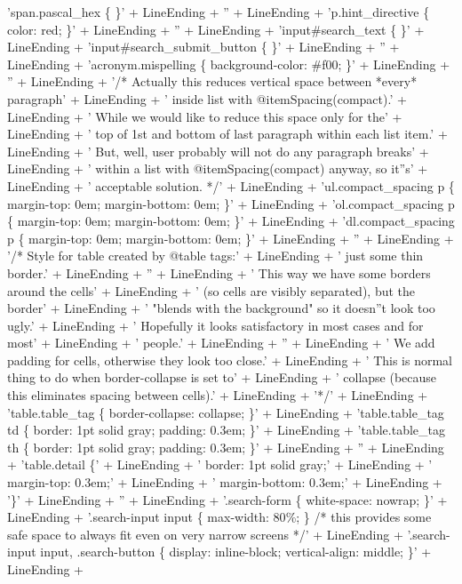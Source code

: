 \documentclass{report}
\begin{document}
\begin{list}{}
\begin{flushleft}
\begin{ttfamily}
'span.pascal{\_}hex {\{} {\}}' + LineEnding +
'' + LineEnding +
'p.hint{\_}directive {\{} color: red; {\}}' + LineEnding +
'' + LineEnding +
'input{\#}search{\_}text {\{} {\}}' + LineEnding +
'input{\#}search{\_}submit{\_}button {\{} {\}}' + LineEnding +
'' + LineEnding +
'acronym.mispelling {\{} background-color: {\#}f00; {\}}' + LineEnding +
'' + LineEnding +
'/* Actually this reduces vertical space between *every* paragraph' + LineEnding +
'   inside list with @itemSpacing(compact).' + LineEnding +
'   While we would like to reduce this space only for the' + LineEnding +
'   top of 1st and bottom of last paragraph within each list item.' + LineEnding +
'   But, well, user probably will not do any paragraph breaks' + LineEnding +
'   within a list with @itemSpacing(compact) anyway, so it''s' + LineEnding +
'   acceptable solution. */' + LineEnding +
'ul.compact{\_}spacing p {\{} margin-top: 0em; margin-bottom: 0em; {\}}' + LineEnding +
'ol.compact{\_}spacing p {\{} margin-top: 0em; margin-bottom: 0em; {\}}' + LineEnding +
'dl.compact{\_}spacing p {\{} margin-top: 0em; margin-bottom: 0em; {\}}' + LineEnding +
'' + LineEnding +
'/* Style for table created by @table tags:' + LineEnding +
'   just some thin border.' + LineEnding +
'' + LineEnding +
'   This way we have some borders around the cells' + LineEnding +
'   (so cells are visibly separated), but the border' + LineEnding +
'   "blends with the background" so it doesn''t look too ugly.' + LineEnding +
'   Hopefully it looks satisfactory in most cases and for most' + LineEnding +
'   people.' + LineEnding +
'' + LineEnding +
'   We add padding for cells, otherwise they look too close.' + LineEnding +
'   This is normal thing to do when border-collapse is set to' + LineEnding +
'   collapse (because this eliminates spacing between cells).' + LineEnding +
'*/' + LineEnding +
'table.table{\_}tag {\{} border-collapse: collapse; {\}}' + LineEnding +
'table.table{\_}tag td {\{} border: 1pt solid gray; padding: 0.3em; {\}}' + LineEnding +
'table.table{\_}tag th {\{} border: 1pt solid gray; padding: 0.3em; {\}}' + LineEnding +
'' + LineEnding +
'table.detail {\{}' + LineEnding +
'  border: 1pt solid gray;' + LineEnding +
'  margin-top: 0.3em;' + LineEnding +
'  margin-bottom: 0.3em;' + LineEnding +
'{\}}' + LineEnding +
'' + LineEnding +
'.search-form {\{} white-space: nowrap; {\}}' + LineEnding +
'.search-input input {\{} max-width: 80{\%}; {\}} /* this provides some safe space to always fit even on very narrow screens */' + LineEnding +
'.search-input input, .search-button {\{} display: inline-block; vertical-align: middle; {\}}' + LineEnding +

\end{ttfamily}
\end{flushleft}
\end{list}
\end{document}

